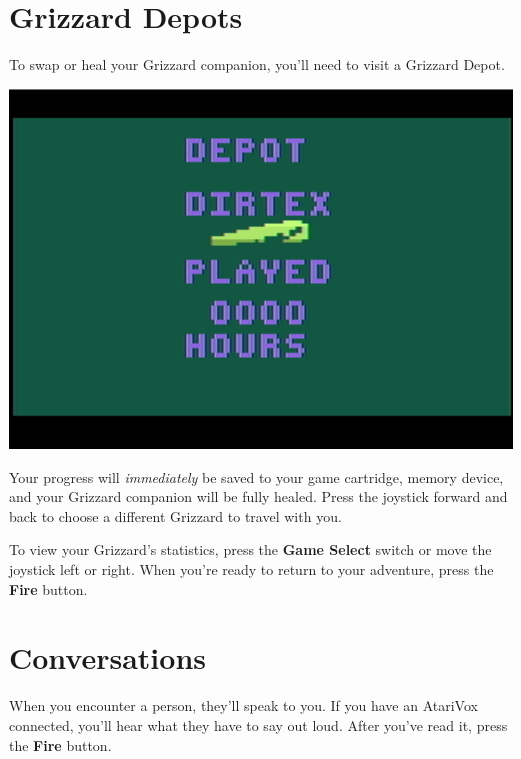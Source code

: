 \documentclass[10pt,twocolumn,openany,article]{memoir}
\begin{document}
\section{Grizzard Depots}\label{sec:GrizzardDepot}

To  \ifdefined\NOSAVE\else swap  or  \fi heal  your Grizzard  companion,
you'll need to visit a Grizzard Depot.

\begin{center}
  \includegraphics[width=\columnwidth]{../Manual/DepotScreenshotNTSC.png}
\end{center}

\ifdefined\NOSAVE\else Your progress will \emph{immediately} be saved to
your \ifdefined\ATARIAGESAVE  game cartridge,  \else memory  device, \fi
\fi   and    your   Grizzard    companion   will   be    fully   healed.
\ifdefined\NOSAVE\else  Press the  joystick forward  and back  to choose
a different Grizzard to travel with you. \fi

To  view  your Grizzard's  statistics,  press  the \textbf{Game  Select}
switch or move  the joystick left or right. When  you're ready to return
to your adventure, press the \textbf{Fire} button.

\section{Conversations}

When  you encounter  a person,  they'll  speak to  you. If  you have  an
AtariVox  connected,  you'll  hear  what  they have  to  say  out  loud.
After you've read it, press the \textbf{Fire} button.
\end{document}

